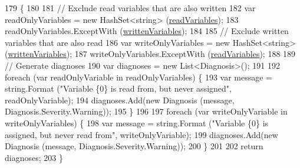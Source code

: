 \begin{DoxyCode}
179         \{
180 
181             \textcolor{comment}{// Exclude read variables that are also written}
182             var readOnlyVariables = \textcolor{keyword}{new} HashSet<string> (\hyperlink{a00084_a6b542092ddce1b92c9455d60899518a9}{readVariables});
183             readOnlyVariables.ExceptWith (\hyperlink{a00084_a0c2fe6eded1b10b135ca2469f5980a39}{writtenVariables});
184 
185             \textcolor{comment}{// Exclude written variables that are also read}
186             var writeOnlyVariables = \textcolor{keyword}{new} HashSet<string> (\hyperlink{a00084_a0c2fe6eded1b10b135ca2469f5980a39}{writtenVariables});
187             writeOnlyVariables.ExceptWith (\hyperlink{a00084_a6b542092ddce1b92c9455d60899518a9}{readVariables});
188 
189             \textcolor{comment}{// Generate diagnoses}
190             var diagnoses = \textcolor{keyword}{new} List<Diagnosis>();
191 
192             \textcolor{keywordflow}{foreach} (var readOnlyVariable \textcolor{keywordflow}{in} readOnlyVariables) \{
193                 var message = string.Format (\textcolor{stringliteral}{"Variable \{0\} is read from, but never assigned"}, 
      readOnlyVariable);
194                 diagnoses.Add(\textcolor{keyword}{new} Diagnosis (message, Diagnosis.Severity.Warning));
195             \}
196 
197             \textcolor{keywordflow}{foreach} (var writeOnlyVariable \textcolor{keywordflow}{in} writeOnlyVariables) \{
198                 var message = string.Format (\textcolor{stringliteral}{"Variable \{0\} is assigned, but never read from"}, 
      writeOnlyVariable);
199                 diagnoses.Add(\textcolor{keyword}{new} Diagnosis (message, Diagnosis.Severity.Warning));
200             \}
201 
202             \textcolor{keywordflow}{return} diagnoses;
203         \}
\end{DoxyCode}


